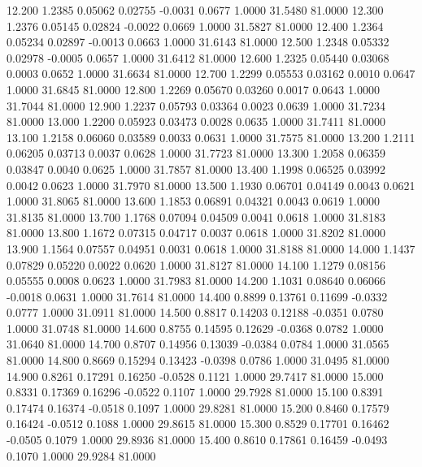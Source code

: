   12.200   1.2385   0.05062   0.02755  -0.0031   0.0677   1.0000  31.5480  81.0000
  12.300   1.2376   0.05145   0.02824  -0.0022   0.0669   1.0000  31.5827  81.0000
  12.400   1.2364   0.05234   0.02897  -0.0013   0.0663   1.0000  31.6143  81.0000
  12.500   1.2348   0.05332   0.02978  -0.0005   0.0657   1.0000  31.6412  81.0000
  12.600   1.2325   0.05440   0.03068   0.0003   0.0652   1.0000  31.6634  81.0000
  12.700   1.2299   0.05553   0.03162   0.0010   0.0647   1.0000  31.6845  81.0000
  12.800   1.2269   0.05670   0.03260   0.0017   0.0643   1.0000  31.7044  81.0000
  12.900   1.2237   0.05793   0.03364   0.0023   0.0639   1.0000  31.7234  81.0000
  13.000   1.2200   0.05923   0.03473   0.0028   0.0635   1.0000  31.7411  81.0000
  13.100   1.2158   0.06060   0.03589   0.0033   0.0631   1.0000  31.7575  81.0000
  13.200   1.2111   0.06205   0.03713   0.0037   0.0628   1.0000  31.7723  81.0000
  13.300   1.2058   0.06359   0.03847   0.0040   0.0625   1.0000  31.7857  81.0000
  13.400   1.1998   0.06525   0.03992   0.0042   0.0623   1.0000  31.7970  81.0000
  13.500   1.1930   0.06701   0.04149   0.0043   0.0621   1.0000  31.8065  81.0000
  13.600   1.1853   0.06891   0.04321   0.0043   0.0619   1.0000  31.8135  81.0000
  13.700   1.1768   0.07094   0.04509   0.0041   0.0618   1.0000  31.8183  81.0000
  13.800   1.1672   0.07315   0.04717   0.0037   0.0618   1.0000  31.8202  81.0000
  13.900   1.1564   0.07557   0.04951   0.0031   0.0618   1.0000  31.8188  81.0000
  14.000   1.1437   0.07829   0.05220   0.0022   0.0620   1.0000  31.8127  81.0000
  14.100   1.1279   0.08156   0.05555   0.0008   0.0623   1.0000  31.7983  81.0000
  14.200   1.1031   0.08640   0.06066  -0.0018   0.0631   1.0000  31.7614  81.0000
  14.400   0.8899   0.13761   0.11699  -0.0332   0.0777   1.0000  31.0911  81.0000
  14.500   0.8817   0.14203   0.12188  -0.0351   0.0780   1.0000  31.0748  81.0000
  14.600   0.8755   0.14595   0.12629  -0.0368   0.0782   1.0000  31.0640  81.0000
  14.700   0.8707   0.14956   0.13039  -0.0384   0.0784   1.0000  31.0565  81.0000
  14.800   0.8669   0.15294   0.13423  -0.0398   0.0786   1.0000  31.0495  81.0000
  14.900   0.8261   0.17291   0.16250  -0.0528   0.1121   1.0000  29.7417  81.0000
  15.000   0.8331   0.17369   0.16296  -0.0522   0.1107   1.0000  29.7928  81.0000
  15.100   0.8391   0.17474   0.16374  -0.0518   0.1097   1.0000  29.8281  81.0000
  15.200   0.8460   0.17579   0.16424  -0.0512   0.1088   1.0000  29.8615  81.0000
  15.300   0.8529   0.17701   0.16462  -0.0505   0.1079   1.0000  29.8936  81.0000
  15.400   0.8610   0.17861   0.16459  -0.0493   0.1070   1.0000  29.9284  81.0000
